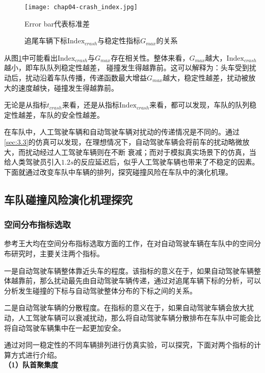 \begin{figure}
    \centering
    \texttt{[image: chap04-crash\_index.jpg]}
    \caption*{Error bar代表标准差}
    \caption{追尾车辆下标$\mathrm{Index}_{crash}$与稳定性指标$G_{max}$的关系}
    \label{fig:chap04-4}
\end{figure} 

从图\ref{fig:chap04-4}中可能看出$\mathrm{Index}_{crash}$与$G_{max}$存在相关性。整体来看，$G_{max}$越大，$\mathrm{Index}_{crash}$越小，即车队队列稳定性越差，
碰撞发生得越靠前。这可以解释为：头车受到扰动后，扰动沿着车队传播，传递函数最大增益$G_{max}$越大，稳定性越差，扰动被放大的速度越快，碰撞发生得越靠前。

无论是从指标$t_{crash}$来看，还是从指标$\mathrm{Index}_{crash}$来看，都可以发现，车队的队列稳定性越差，车队的安全性越差。

在车队中，人工驾驶车辆和自动驾驶车辆对扰动的传递情况是不同的。通过\ref{sec:3.3}的仿真可以发现，在理想情况下，自动驾驶车辆会将前车的扰动略微放大，而扰动经过人工驾驶车辆则在不断
衰减；而对于模拟真实场景下的仿真，当给人类驾驶员引入$1.2s$的反应延迟后，似乎人工驾驶车辆也带来了不稳定的因素。下面就通过改变车队中车辆的排列，探究碰撞风险在车队中的演化机理。

\subsection{车队碰撞风险演化机理探究}
\label{sec:4.2.4}

\subsubsection{空间分布指标选取}
\label{sec:4.2.4.1}

参考王大均在空间分布指标选取方面的工作\cite{wang2021auto}，在对自动驾驶车辆在车队中的空间分布研究时，主要关注两个指标。

一是自动驾驶车辆整体靠近头车的程度。该指标的意义在于，如果自动驾驶车辆整体越靠前，那么扰动最先由自动驾驶车辆传递，通过对追尾车辆下标的分析，可以分析发生碰撞的下标与自动驾驶整体分布的下标之间的关系。

二是自动驾驶车辆的分散程度。在指标的意义在于，如果自动驾驶车辆会放大扰动，人工驾驶车辆可以衰减扰动，那么将自动驾驶车辆分散排布在车队中可能会比将自动驾驶车辆集中在一起更加安全。

通过对同一稳定性的不同车辆排列进行仿真实验，可以探究，下面对两个指标的计算方式进行介绍。 \\

\noindent \textbf{（1）队首聚集度}

